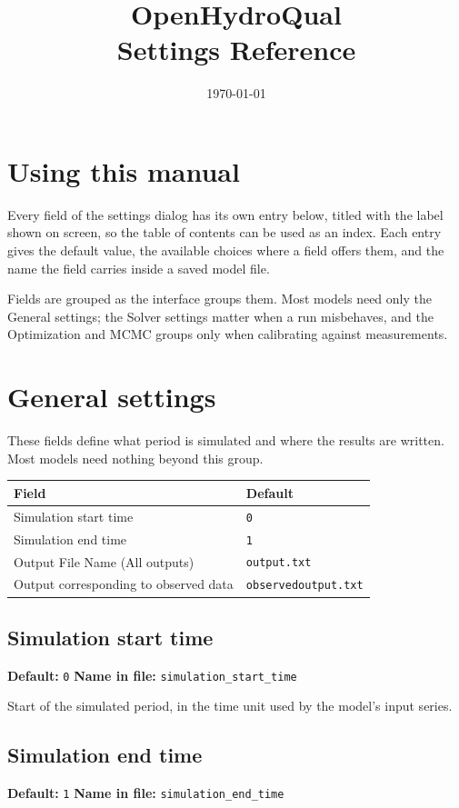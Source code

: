 \documentclass[11pt]{article}
\title{\textbf{OpenHydroQual}\\[4pt]\large Settings Reference}
\author{}\date{\today}
\begin{document}
\maketitle\thispagestyle{empty}

\section*{Using this manual}
Every field of the settings dialog has its own entry below, titled with the
label shown on screen, so the table of contents can be used as an index. Each
entry gives the default value, the available choices where a field offers them,
and the name the field carries inside a saved model file.

Fields are grouped as the interface groups them. Most models need only the
General settings; the Solver settings matter when a run misbehaves, and the
Optimization and MCMC groups only when calibrating against measurements.
\vspace{6pt}
\tableofcontents
\newpage

\section{General settings}
These fields define what period is simulated and where the results are written. Most models need nothing beyond this group.
\begin{longtable}{@{}p{}p{}@{}}
\toprule \textrm{Field} & \textrm{Default} \\ \midrule \endhead
Simulation start time & \texttt{\small 0} \\
Simulation end time & \texttt{\small 1} \\
Output File Name (All outputs) & \texttt{\small output.\allowbreak{}txt} \\
Output corresponding to observed data & \texttt{\small observedoutput.\allowbreak{}txt} \\
\bottomrule\end{longtable}
\subsection{Simulation start time}
{\small \textbf{Default:} \texttt{0} \quad\textbullet\quad \textbf{Name in file:} \texttt{simulation\_\allowbreak{}start\_\allowbreak{}time}}

Start of the simulated period, in the time unit used by the model's input series.
\subsection{Simulation end time}
{\small \textbf{Default:} \texttt{1} \quad\textbullet\quad \textbf{Name in file:} \texttt{simulation\_\allowbreak{}end\_\allowbreak{}time}}
\end{document}
